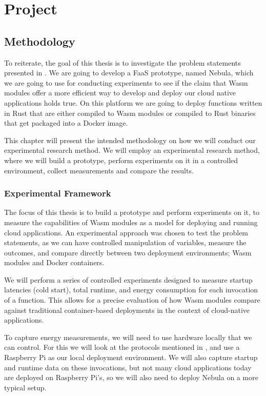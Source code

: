 \documentclass[
  table]{report}
\begin{document}
\part{Project}

\chapter{Methodology} 
\label{chap:method}

To reiterate, the goal of this thesis is to investigate the problem
statements presented in . We are going to develop a
FaaS prototype, named Nebula, which we are going to use for conducting
experiments to see if the claim that \ac{Wasm} modules offer a more
efficient way to develop and deploy our cloud native applications holds
true. On this platform we are going to deploy functions written in Rust
that are either compiled to \ac{Wasm} modules or compiled to Rust
binaries that get packaged into a Docker image.

This chapter will present the intended methodology on how we will
conduct our experimental research method. We will employ an experimental
research method, where we will build a prototype, perform experiments on
it in a controlled environment, collect measurements and compare the
results.

\section{Experimental Framework}
\label{sect:exp_frame}

The focus of this thesis is to build a prototype and perform experiments
on it, to measure the capabilities of \ac{Wasm} modules as a model for
deploying and running cloud applications. An experimental approach was
chosen to test the problem statements, as we can have controlled
manipulation of variables, measure the outcomes, and compare directly
between two deployment environments; \ac{Wasm} modules and Docker
containers.

We will perform a series of controlled experiments designed to measure
startup latencies (cold start), total runtime, and energy consumption
for each invocation of a function. This allows for a precise evaluation
of how \ac{Wasm} modules compare against traditional container-based
deployments in the context of cloud-native applications.

To capture energy measurements, we will need to use hardware locally
that we can control. For this we will look at the protocols mentioned in
, and use a Raspberry Pi as our local
deployment environment. We will also capture startup and runtime data on
these invocations, but not many cloud applications today are deployed on
Raspberry Pi's, so we will also need to deploy Nebula on a more typical
setup.
\end{document}
